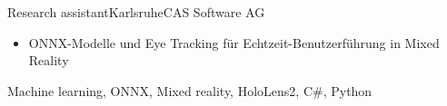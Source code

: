 {\begin{experiences}
{\begin{itemize}
{            \fi}
            \def\cvFhgKiprot{\ifcvshowkiprot
            \item \textbf{Visuelle Klassifikation} von Bauteilen in Verschleppungsklassen für \link{https://ki-prot.de}{KI-PrOT}, um Chemikalien in der Oberflächentechnik zu sparen: Datensatz erstellt, annotiert und mit \textbf{DVC} versioniert
            \fi}
            \cvFraunhoferOrder
        \end{itemize}
    }
    {\cvFhgTags}
        
    \emptySeparator
    
    \experience
    {}   {Research assistant}{Karlsruhe}{CAS Software AG}
    {
    } 
    {
        \ifcvshowcasdetail
        \begin{itemize}
            \item ONNX-Modelle und Eye Tracking für Echtzeit-Benutzerführung in Mixed Reality
        \end{itemize}
        \fi
    }
    {Machine learning, ONNX, Mixed reality, HoloLens2, C\#, Python}
    \end{experiences}
}
